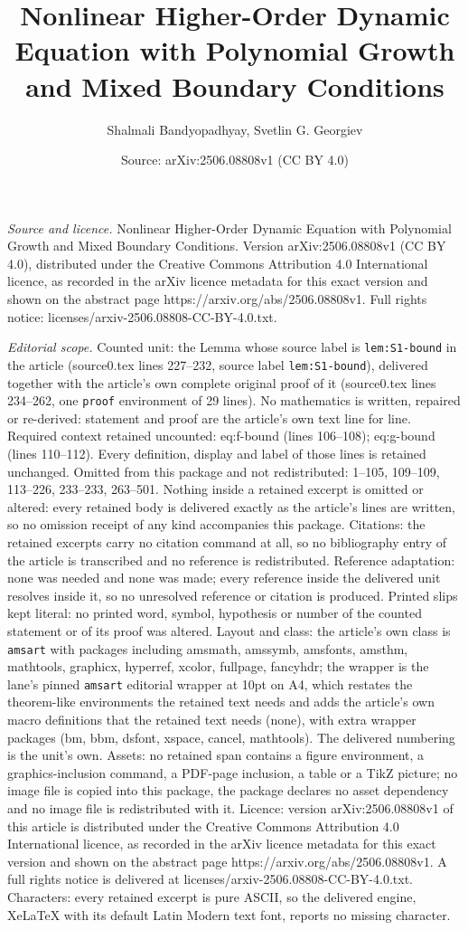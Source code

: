 \documentclass[10pt,a4paper]{amsart}
\title[Nonlinear Higher-Order Dynamic Equation with Polynomial Grow]{Nonlinear Higher-Order Dynamic Equation with Polynomial Growth and Mixed Boundary Conditions}
\author{Shalmali Bandyopadhyay, Svetlin G. Georgiev}
\date{Source: arXiv:2506.08808v1 (CC BY 4.0)}
\begin{document}
\maketitle

\noindent\emph{Source and licence.} Nonlinear Higher-Order Dynamic Equation with Polynomial Growth and Mixed Boundary Conditions. Version arXiv:2506.08808v1 (CC BY 4.0), distributed under the Creative Commons Attribution 4.0 International licence, as recorded in the arXiv licence metadata for this exact version and shown on the abstract page https://arxiv.org/abs/2506.08808v1. Full rights notice: licenses/arxiv-2506.08808-CC-BY-4.0.txt.\par\smallskip

\noindent\textit{Editorial scope.} Counted unit: the Lemma whose source label is \texttt{lem:S1-bound} in the article (source0.tex lines 227--232, source label \texttt{lem:S1-bound}), delivered together with the article's own complete original proof of it (source0.tex lines 234--262, one \texttt{proof} environment of 29 lines). No mathematics is written, repaired or re-derived: statement and proof are the article's own text line for line. Required context retained uncounted: eq:f-bound (lines 106--108); eq:g-bound (lines 110--112). Every definition, display and label of those lines is retained unchanged. Omitted from this package and not redistributed: 1--105, 109--109, 113--226, 233--233, 263--501. Nothing inside a retained excerpt is omitted or altered: every retained body is delivered exactly as the article's lines are written, so no omission receipt of any kind accompanies this package. Citations: the retained excerpts carry no citation command at all, so no bibliography entry of the article is transcribed and no reference is redistributed. Reference adaptation: none was needed and none was made; every reference inside the delivered unit resolves inside it, so no unresolved reference or citation is produced. Printed slips kept literal: no printed word, symbol, hypothesis or number of the counted statement or of its proof was altered. Layout and class: the article's own class is \texttt{amsart} with packages including amsmath, amssymb, amsfonts, amsthm, mathtools, graphicx, hyperref, xcolor, fullpage, fancyhdr; the wrapper is the lane's pinned \texttt{amsart} editorial wrapper at 10pt on A4, which restates the theorem-like environments the retained text needs and adds the article's own macro definitions that the retained text needs (none), with extra wrapper packages (bm, bbm, dsfont, xspace, cancel, mathtools). The delivered numbering is the unit's own. Assets: no retained span contains a figure environment, a graphics-inclusion command, a PDF-page inclusion, a table or a TikZ picture; no image file is copied into this package, the package declares no asset dependency and no image file is redistributed with it. Licence: version arXiv:2506.08808v1 of this article is distributed under the Creative Commons Attribution 4.0 International licence, as recorded in the arXiv licence metadata for this exact version and shown on the abstract page https://arxiv.org/abs/2506.08808v1. A full rights notice is delivered at licenses/arxiv-2506.08808-CC-BY-4.0.txt. Characters: every retained excerpt is pure ASCII, so the delivered engine, XeLaTeX with its default Latin Modern text font, reports no missing character.
\end{document}
